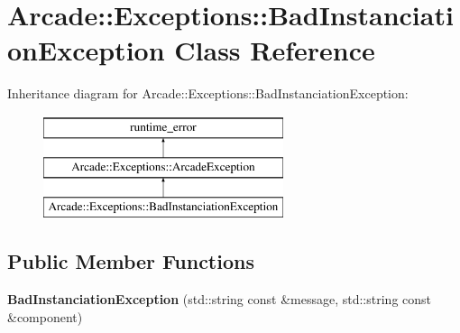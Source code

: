 \hypertarget{classArcade_1_1Exceptions_1_1BadInstanciationException}{}\section{Arcade\+::Exceptions\+::Bad\+Instanciation\+Exception Class Reference}
\label{classArcade_1_1Exceptions_1_1BadInstanciationException}
Inheritance diagram for Arcade\+::Exceptions\+::Bad\+Instanciation\+Exception\+:\begin{figure}[H]
\begin{center}
\leavevmode
\includegraphics[height=3.000000cm]{classArcade_1_1Exceptions_1_1BadInstanciationException}
\end{center}
\end{figure}
\subsection*{Public Member Functions}
\begin{DoxyCompactItemize}
\item 
\mbox{\label{classArcade_1_1Exceptions_1_1BadInstanciationException_af23ea9690c2d1ebf5b90bdb30561dd3b}} 
{\bfseries Bad\+Instanciation\+Exception} (std\+::string const \&message, std\+::string const \&component)
\end{DoxyCompactItemize}
